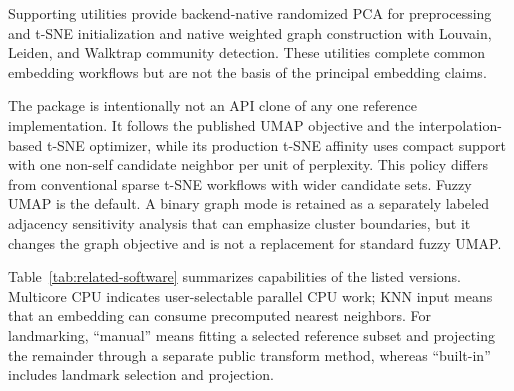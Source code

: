 \documentclass[article]{jss}
\begin{document}
Supporting utilities provide backend-native randomized PCA for preprocessing
and t-SNE initialization and native weighted graph construction with Louvain,
Leiden, and Walktrap community detection. These utilities complete common
embedding workflows but are not the basis of the principal embedding claims.

The package is intentionally not an API clone of any one reference
implementation. It follows the published UMAP objective and the
interpolation-based t-SNE optimizer, while its production t-SNE affinity uses
compact support with one non-self candidate neighbor per unit of perplexity.
This policy differs from conventional sparse t-SNE workflows with wider
candidate sets. Fuzzy UMAP is the default. A binary graph mode
is retained as a separately labeled adjacency sensitivity analysis that can
emphasize cluster boundaries, but it changes the graph objective and is not a
replacement for standard fuzzy UMAP.

Table~\ref{tab:related-software} summarizes capabilities of the listed
versions. Multicore CPU indicates user-selectable parallel CPU work; KNN
input means that an embedding can consume precomputed nearest neighbors.
For landmarking, ``manual'' means fitting a selected reference subset and
projecting the remainder through a separate public transform method,
whereas ``built-in'' includes landmark selection and projection.
\end{document}
